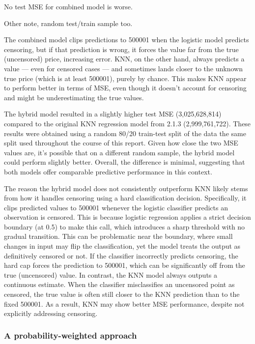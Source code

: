 \documentclass[
]{article}
\begin{document}
No test MSE for combined model is worse.

Other note, random test/train sample too.

The combined model clips predictions to 500001 when the logistic model
predicts censoring, but if that prediction is wrong, it forces the value
far from the true (uncensored) price, increasing error. KNN, on the
other hand, always predicts a value --- even for censored cases --- and
sometimes lands closer to the unknown true price (which is at least
500001), purely by chance. This makes KNN appear to perform better in
terms of MSE, even though it doesn't account for censoring and might be
underestimating the true values.

The hybrid model resulted in a slightly higher test MSE (3,025,628,814)
compared to the original KNN regression model from 2.1.3
(2,999,761,722). These results were obtained using a random 80/20
train-test split of the data the same split used throughout the course
of this report. Given how close the two MSE values are, it's possible
that on a different random sample, the hybrid model could perform
slightly better. Overall, the difference is minimal, suggesting that
both models offer comparable predictive performance in this context.

The reason the hybrid model does not consistently outperform KNN likely
stems from how it handles censoring using a hard classification
decision. Specifically, it clips predicted values to 500001 whenever the
logistic classifier predicts an observation is censored. This is because
logistic regression applies a strict decision boundary (at 0.5) to make
this call, which introduces a sharp threshold with no gradual
transition. This can be problematic near the boundary, where small
changes in input may flip the classification, yet the model treats the
output as definitively censored or not. If the classifier incorrectly
predicts censoring, the hard cap forces the prediction to 500001, which
can be significantly off from the true (uncensored) value. In contrast,
the KNN model always outputs a continuous estimate. When the classifier
misclassifies an uncensored point as censored, the true value is often
still closer to the KNN prediction than to the fixed 500001. As a
result, KNN may show better MSE performance, despite not explicitly
addressing censoring.

\subsubsection{A probability-weighted
approach}\label{a-probability-weighted-approach}
\end{document}

